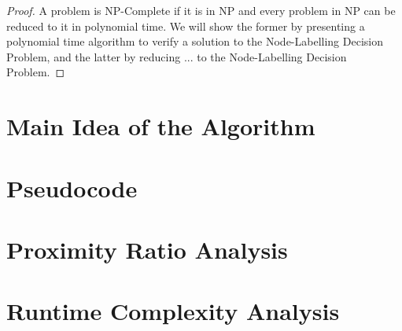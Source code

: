 \documentclass{article}
\begin{document}
\begin{proof}
    A problem is NP-Complete if it is in NP and every problem in NP can be reduced to it in polynomial time.
    We will show the former by presenting a polynomial time algorithm to verify a solution to the Node-Labelling Decision Problem,
    and the latter by reducing ... to the Node-Labelling Decision Problem.
\end{proof}

\section{Main Idea of the Algorithm}



\section{Pseudocode}

\begin{algorithm}[H]
\caption{}
\KwIn{}
\KwOut{}
\BlankLine

\end{algorithm}

\section{Proximity Ratio Analysis}



\section{Runtime Complexity Analysis}
\end{document}
